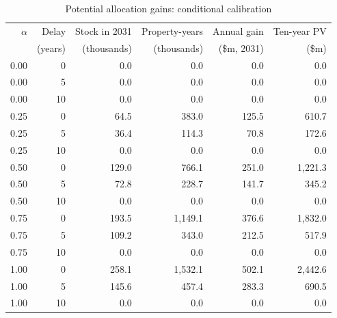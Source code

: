 \begin{table}[!ht]\centering
\caption{Potential allocation gains: conditional calibration}\label{tab:welfare}
{\small
\begin{tabular}{rrrrrr}\toprule
$\alpha$ & Delay & Stock in 2031 & Property-years & Annual gain & Ten-year PV \\
 & (years) & (thousands) & (thousands) & (\$m, 2031) & (\$m) \\
\midrule
0.00 & 0 & 0.0 & 0.0 & 0.0 & 0.0 \\
0.00 & 5 & 0.0 & 0.0 & 0.0 & 0.0 \\
0.00 & 10 & 0.0 & 0.0 & 0.0 & 0.0 \\
0.25 & 0 & 64.5 & 383.0 & 125.5 & 610.7 \\
0.25 & 5 & 36.4 & 114.3 & 70.8 & 172.6 \\
0.25 & 10 & 0.0 & 0.0 & 0.0 & 0.0 \\
0.50 & 0 & 129.0 & 766.1 & 251.0 & 1,221.3 \\
0.50 & 5 & 72.8 & 228.7 & 141.7 & 345.2 \\
0.50 & 10 & 0.0 & 0.0 & 0.0 & 0.0 \\
0.75 & 0 & 193.5 & 1,149.1 & 376.6 & 1,832.0 \\
0.75 & 5 & 109.2 & 343.0 & 212.5 & 517.9 \\
0.75 & 10 & 0.0 & 0.0 & 0.0 & 0.0 \\
1.00 & 0 & 258.1 & 1,532.1 & 502.1 & 2,442.6 \\
1.00 & 5 & 145.6 & 457.4 & 283.3 & 690.5 \\
1.00 & 10 & 0.0 & 0.0 & 0.0 & 0.0 \\
\bottomrule\end{tabular}}
\begin{minipage}{0.96\textwidth}\end{minipage}\end{table}
